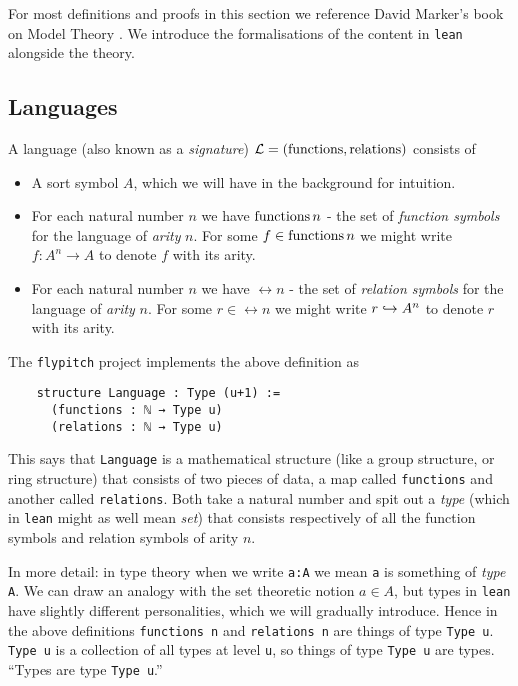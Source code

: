 For most definitions and proofs in this section we reference
David Marker's book on Model Theory \cite{marker}.
We introduce the formalisations of the content in \texttt{lean} alongside the theory.

\subsection{Languages}
\begin{dfn}[Language]
  A language (also known as a \textit{signature}) $\mathcal{L} = ( \operatorname{functions} , \operatorname{relations} )$ consists of

  \begin{itemize}
    \item A sort symbol $A$, which we will have in the background for intuition.
    \item For each natural number $n$ we have $\operatorname{functions} n$ -
          the set of \textit{function symbols} for the language of \textit{arity} $n$.
          For some $f \in \operatorname{functions} n$ we might write
          $f : A^{n} \to A$ to denote $f$ with its arity.
    \item For each natural number $n$ we have $\rel n$ -
          the set of \textit{relation symbols} for the language of \textit{arity} $n$.
          For some $r \in \rel n$ we might write
          $r \hookrightarrow A^{n}$ to denote $r$ with its arity.
  \end{itemize}

  The \texttt{flypitch} project implements the above definition as

  \begin{lstlisting}
    structure Language : Type (u+1) :=
      (functions : ℕ → Type u)
      (relations : ℕ → Type u)\end{lstlisting}

  This says that \texttt{Language} is a mathematical structure
  (like a group structure, or ring structure)
  that consists of two pieces of data,
  a map called \texttt{functions} and another called \texttt{relations}.
  Both take a natural number and spit out a \textit{type}
  (which in \texttt{lean} might as well mean \textit{set})
  that consists respectively of all the function symbols and relation symbols of arity $n$.

  In more detail: in type theory when we write \texttt{a:A} we mean \texttt{a} is something
  of \textit{type} \texttt{A}.
  We can draw an analogy with the set theoretic notion $a \in A$,
  but types in \texttt{lean} have slightly different
  personalities, which we will gradually introduce.
  Hence in the above definitions \texttt{functions n} and \texttt{relations n}
  are things of type \texttt{Type u}.
  \texttt{Type u} is a collection of all types at level \texttt{u},
  so things of type \texttt{Type u} are types.
  ``Types are type \texttt{Type u}.''


\end{dfn}

